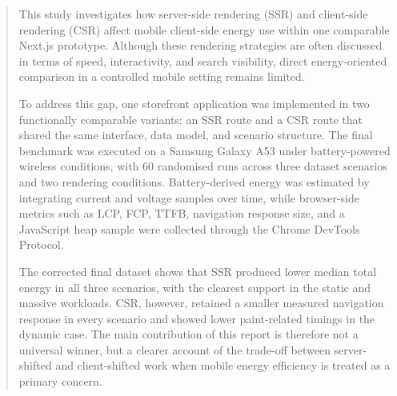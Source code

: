 \begin{abstract}
This study investigates how server-side rendering (SSR) and client-side rendering (CSR) affect mobile client-side energy use within one comparable Next.js prototype. Although these rendering strategies are often discussed in terms of speed, interactivity, and search visibility, direct energy-oriented comparison in a controlled mobile setting remains limited.

To address this gap, one storefront application was implemented in two functionally comparable variants: an SSR route and a CSR route that shared the same interface, data model, and scenario structure. The final benchmark was executed on a Samsung Galaxy A53 under battery-powered wireless conditions, with 60 randomised runs across three dataset scenarios and two rendering conditions. Battery-derived energy was estimated by integrating current and voltage samples over time, while browser-side metrics such as LCP, FCP, TTFB, navigation response size, and a JavaScript heap sample were collected through the Chrome DevTools Protocol.

The corrected final dataset shows that SSR produced lower median total energy in all three scenarios, with the clearest support in the static and massive workloads. CSR, however, retained a smaller measured navigation response in every scenario and showed lower paint-related timings in the dynamic case. The main contribution of this report is therefore not a universal winner, but a clearer account of the trade-off between server-shifted and client-shifted work when mobile energy efficiency is treated as a primary concern.

\end{abstract}
